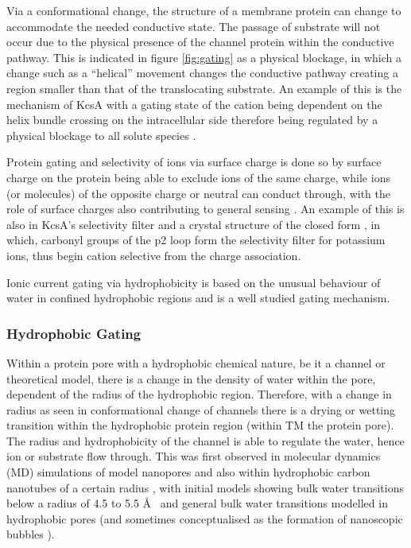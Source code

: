 Via a conformational change, the structure of a membrane protein can change to accommodate the needed conductive state. The passage of substrate will not occur due to the physical presence of the channel protein within the conductive pathway. This is indicated in figure \ref{fig:gating} as a physical blockage, in which a change such as a ``helical'' movement changes the conductive pathway creating a region smaller than that of the translocating substrate. An example of this is the mechanism of KcsA with a gating state of the cation being dependent on the helix bundle crossing on the intracellular side therefore being regulated by a physical blockage to all solute species \cite{Uysal2009}.

Protein gating  and selectivity of ions via surface charge is done so by surface charge on the protein being able to exclude ions of the same charge, while ions (or molecules) of the opposite charge or neutral can conduct through, with the role of surface charges also contributing to general sensing \cite{Madeja2000}.  An example of this is also in KcsA's selectivity filter \cite{Zhou2001} and a crystal structure of the closed form \cite{Uysal2009}, in which, carbonyl groups of the p2 loop form the selectivity filter for potassium ions, thus begin cation selective from the charge association.

Ionic current gating via hydrophobicity is based on the unusual behaviour of water in confined hydrophobic regions and is a well studied gating mechanism. 

\subsubsection*{Hydrophobic Gating}

Within a protein pore with a hydrophobic chemical nature, be it a channel or theoretical model, there is a change in the density of water within the pore, dependent of the radius of the hydrophobic region. Therefore, with a change in radius as seen in conformational change of channels there is a drying or wetting transition within the hydrophobic protein region (within TM the protein pore). The radius and hydrophobicity of the channel is able to regulate the water, hence ion or substrate flow through. This was first observed in molecular dynamics (MD) simulations of model nanopores and also within hydrophobic carbon nanotubes of a certain radius \cite{Hummer2001,Beckstein2001}, with initial models showing bulk water transitions below a radius of 4.5 to 5.5 \AA\  \cite{Beckstein2003,Beckstein2004c} and general bulk water transitions modelled in hydrophobic pores \cite{Allen2003a,Allen2003g} (and sometimes conceptualised as the formation of nanoscopic bubbles \cite{Roth2008}).

